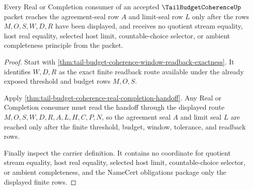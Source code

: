 \begin{theorem}
\label{thm:tail-budget-coherence-seal-nonescape}
Every Real or Completion consumer of an accepted $\TailBudgetCoherenceUp$ packet reaches the agreement-seal row $A$ and limit-seal row $L$ only after the rows $M,O,S,W,D,R$ have been displayed, and receives no quotient stream equality, host real equality, selected host limit, countable-choice selector, or ambient completeness principle from the packet.
\end{theorem}
\begin{proof}
Start with \autoref{thm:tail-budget-coherence-window-readback-exactness}. It identifies $W,D,R$ as the exact finite readback route available under the already exposed threshold and budget rows $M,O,S$.

Apply \autoref{thm:tail-budget-coherence-real-completion-handoff}. Any Real or Completion consumer must read the handoff through the displayed route $M,O,S,W,D,R,A,L,H,C,P,N$, so the agreement seal $A$ and limit seal $L$ are reached only after the finite threshold, budget, window, tolerance, and readback rows.

Finally inspect the carrier definition. It contains no coordinate for quotient stream equality, host real equality, selected host limit, countable-choice selector, or ambient completeness, and the NameCert obligations package only the displayed finite rows.
\end{proof}

